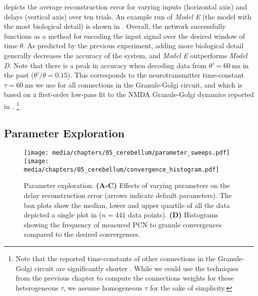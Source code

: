  depicts the average reconstruction error for varying inputs (horizontal axis) and delays (vertical axis) over ten trials.
An example run of \emph{Model E} (the model with the most biological detail) is shown in .
Overall, the network successfully functions as a method for encoding the input signal over the desired window of time $\theta$.
As predicted by the previous experiment, adding more biological detail generally decreases the accuracy of the system, and \emph{Model E} outperforms \emph{Model D}.
Note that there is a peak in accuracy when decoding data from $\theta' = \SI{60}{\milli\second}$ in the past ($\theta'/\theta=0.15$).
This corresponds to the neurotransmitter time-constant $\tau = \SI{60}{\milli\second}$ we use for all connections in the Granule-Golgi circuit, and which is based on a first-order low-pass fit to the NMDA Granule-Golgi dynamics reported in \citet{dieudonne1998submillisecond}.%
\footnote{Note that the reported time-constants of other connections in the Granule-Golgi circuit are significantly shorter \citep{kanichay2008synaptic}.
While we could use the techniques from the previous chapter to compute the connections weights for these heterogeneous $\tau$, we assume homogeneous $\tau$ for the sake of simplicity.}

\clearpage

\subsection{Parameter Exploration}
\label{sec:cerebellum_vary_parameters}

\begin{figure}[t]%
	\centering
	\texttt{[image: media/chapters/05\_cerebellum/parameter\_sweeps.pdf]}%
	\texttt{[image: media/chapters/05\_cerebellum/convergence\_histogram.pdf]}%
	{\label{fig:cerebellum_param_sweeps_a}}%
	{\label{fig:cerebellum_param_sweeps_b}}%
	{\label{fig:cerebellum_param_sweeps_c}}%
	{\label{fig:cerebellum_param_sweeps_d}}%
	\caption[Cerebellum model parameter exploration.]{Parameter exploration. \textbf{(A-C)} Effects of varying parameters on the delay reconstruction error (arrows indicate default parameters). The box plots show the median, lower and upper quartile of all the data depicted a single plot in  ($n = 441$ data points). \textbf{(D)} Histograms showing the frequency of measured PCN to granule convergences compared to the desired convergences.}
	\label{fig:cerebellum_param_sweeps}
\end{figure}

